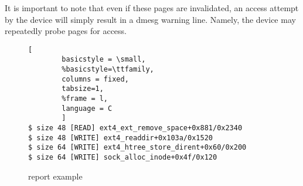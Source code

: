 It is important to note that even if these pages are invalidated, an access attempt by the device will simply result in a dmesg warning line. Namely, the device may repeatedly probe pages for access.

\begin{figure}[t]
\begin{adjustbox}{width=\linewidth}
        \begin{lstlisting}[
        basicstyle = \small,
        %basicstyle=\ttfamily,
        columns = fixed,
        tabsize=1,
        %frame = l,
        language = C
        ]
$ size 48 [READ] ext4_ext_remove_space+0x881/0x2340
$ size 48 [WRITE] ext4_readdir+0x103a/0x1520
$ size 64 [WRITE] ext4_htree_store_dirent+0x60/0x200
$ size 64 [WRITE] sock_alloc_inode+0x4f/0x120
        \end{lstlisting}
\end{adjustbox}
        \caption{\dkasan report example}
        \label{fig:dkasan-report}
\end{figure}
